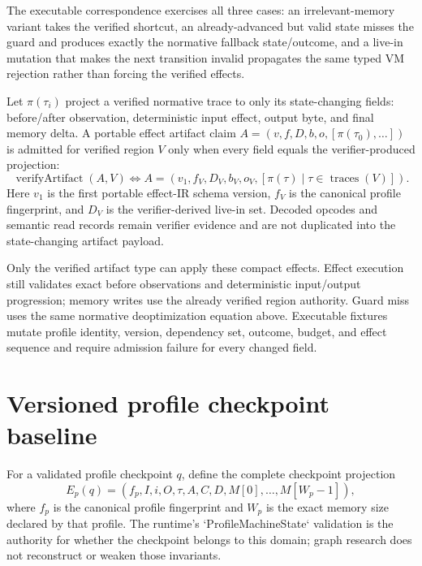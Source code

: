 \documentclass{article}
\begin{document}
The executable correspondence exercises all three cases: an irrelevant-memory
variant takes the verified shortcut, an already-advanced but valid state misses
the guard and produces exactly the normative fallback state/outcome, and a
live-in mutation that makes the next transition invalid propagates the same typed
VM rejection rather than forcing the verified effects.

Let $\pi(\tau_i)$ project a verified normative trace to only its state-changing
fields: before/after observation, deterministic input effect, output byte, and
final memory delta. A portable effect artifact claim
$A=(v,f,D,b,o,[\pi(\tau_0),\ldots])$ is admitted for verified region $V$ only
when every field equals the verifier-produced projection:
\begin{equation}
  \operatorname{verifyArtifact}(A,V)
  \Longleftrightarrow
  A=\left(v_1,f_V,D_V,b_V,o_V,
    [\pi(\tau)\mid\tau\in\operatorname{traces}(V)]\right).
  \label{eq:state-graph-verified-effect-artifact}
\end{equation}
Here $v_1$ is the first portable effect-IR schema version, $f_V$ is the canonical
profile fingerprint, and $D_V$ is the verifier-derived live-in set. Decoded
opcodes and semantic read records remain verifier evidence and are not duplicated
into the state-changing artifact payload.

Only the verified artifact type can apply these compact effects. Effect execution
still validates exact before observations and deterministic input/output
progression; memory writes use the already verified region authority. Guard miss
uses the same normative deoptimization equation above. Executable fixtures mutate
profile identity, version, dependency set, outcome, budget, and effect sequence
and require admission failure for every changed field.

\section{Versioned profile checkpoint baseline}

For a validated profile checkpoint $q$, define the complete checkpoint projection
\begin{equation}
  E_p(q)=\left(
    f_p,I,i,O,\tau,A,C,D,M[0],\ldots,M[W_p-1]
  \right),
  \label{eq:state-graph-profile-checkpoint}
\end{equation}
where $f_p$ is the canonical profile fingerprint and $W_p$ is the exact memory
size declared by that profile. The runtime's `ProfileMachineState` validation is
the authority for whether the checkpoint belongs to this domain; graph research
does not reconstruct or weaken those invariants.
\end{document}
